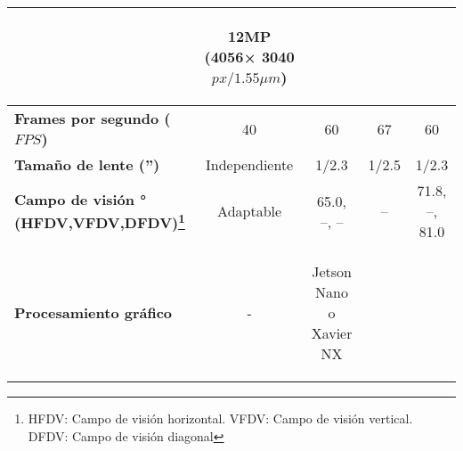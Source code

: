 \begin{itemize}
\begin{savenotes}
\begin{mytable}[H]
\begin{tabular}{l|c|c|c|c|}
\begin{minipage}{\mythirdmaxsizeofcontenttable}
\begin{myflushcenter}
				\end{myflushcenter}\end{minipage} & 
				\begin{minipage}{\mythirdmaxsizeofcontenttable}\begin{myflushcenter}
					12MP (4056× 3040 $px/1.55{\mu}m$)
				\end{myflushcenter}\end{minipage} 
				\\ \hline
				\multicolumn{1}{|l|}{
				\begin{minipage}{\myforthmaxsizeofcontenttable}	
					\textbf{Frames por segundo ($FPS$)}
				\end{minipage}
				} & 40 %
				& 60 & 67 & 
				60
				\\ \hline
				\multicolumn{1}{|l|}{
				\begin{minipage}{\myforthmaxsizeofcontenttable}	
					\textbf{Tamaño de lente ('')}
				\end{minipage}
				} & Independiente & 1/2.3 & 1/2.5 &
				1/2.3
				\\ \hline
				\multicolumn{1}{|l|}{
				\begin{minipage}{\myforthmaxsizeofcontenttable}
					\textbf{Campo de visión ° (HFDV,VFDV,DFDV)\footnote{HFDV: Campo de visión horizontal. VFDV: Campo de visión vertical. DFDV: Campo de visión diagonal}}
				\end{minipage}
				} & Adaptable & 65.0, --, -- & -- & 
				71.8, --, 81.0
				\\ \hline
				\multicolumn{1}{|l|}{
				\begin{minipage}{\myforthmaxsizeofcontenttable}	
					\textbf{Procesamiento gráfico}
				\end{minipage}
				} & - & 
				\begin{minipage}{\mythirdmaxsizeofcontenttable}\begin{myflushcenter}
					Jetson Nano o Xavier NX
				\end{myflushcenter}\end{minipage} & 
				\begin{minipage}{\mythirdmaxsizeofcontenttable}\begin{myflushcenter}

\end{myflushcenter}
\end{minipage}
\end{tabular}
\end{mytable}
\end{savenotes}
\end{itemize}
